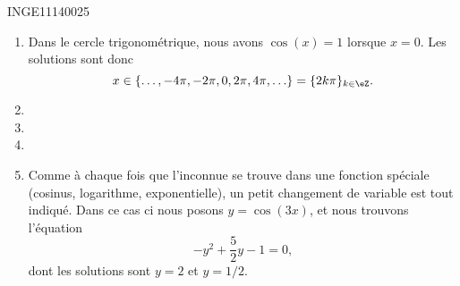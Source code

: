 \documentclass{article}
\begin{document}
\begin{corrige}{INGE11140025}

	\begin{enumerate}

		\item
			Dans le cercle trigonométrique, nous avons $\cos(x)=1$ lorsque $x=0$. Les solutions sont donc 
			\begin{equation}
				x\in\{ \ldots,-4\pi,-2\pi, 0,2\pi,4\pi,\ldots \}=\{ 2k\pi \}_{k\in\eZ}.
			\end{equation}
		\item
		\item
		\item
		\item
			Comme à chaque fois que l'inconnue se trouve dans une fonction spéciale (cosinus, logarithme, exponentielle), un petit changement de variable est tout indiqué. Dans ce cas ci nous posons $y=\cos(3x)$, et nous trouvons l'équation
			\begin{equation}
				-y^2+\frac{ 5 }{2}y-1=0,
			\end{equation}
			dont les solutions sont $y=2$ et $y=1/2$.


\end{enumerate}
\end{corrige}
\end{document}
